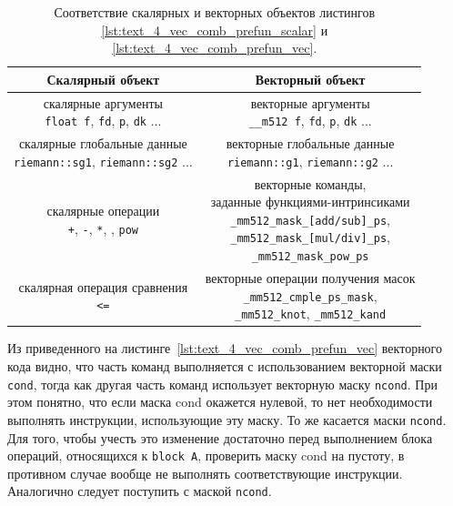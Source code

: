\begin{table}
\centering
\singlespacing
{}\caption{Соответствие скалярных и векторных объектов листингов \ref{lst:text_4_vec_comb_prefun_scalar} и \ref{lst:text_4_vec_comb_prefun_vec}.}
\bigskip
\label{tbl:text_4_vec_comb_prefun_obj}
\begin{tabular}{ | c | c | }
  \hline
  Скалярный объект & Векторный объект \\ \hline\hline
  \makecell{скалярные аргументы \\ \texttt{float f}, \texttt{fd}, \texttt{p}, \texttt{dk} ...} & \makecell{векторные аргументы \\ \texttt{\_\_m512 f}, \texttt{fd}, \texttt{p}, \texttt{dk} ...} \\ \hline
  \makecell{скалярные глобальные данные \\ \texttt{riemann::sg1}, \texttt{riemann::sg2} ...} & \makecell{векторные глобальные данные \\ \texttt{riemann::g1}, \texttt{riemann::g2} ...} \\ \hline
  \makecell{скалярные операции \\ \texttt{+}, \texttt{-}, \texttt{*}, \texttt{\/}, \texttt{pow}} & \makecell{векторные команды, \\ заданные функциями-интринсиками \\ \texttt{\_mm512\_mask\_[add/sub]\_ps}, \\ \texttt{\_mm512\_mask\_[mul/div]\_ps}, \\ \texttt{\_mm512\_mask\_pow\_ps}} \\ \hline
  \makecell{скалярная операция сравнения \\ \texttt{<=}} & \makecell{векторные операции получения масок \\ \texttt{\_mm512\_cmple\_ps\_mask}, \\ \texttt{\_mm512\_knot}, \texttt{\_mm512\_kand}} \\ \hline
\end{tabular}
\end{table}

Из приведенного на листинге~\ref{lst:text_4_vec_comb_prefun_vec} векторного кода видно, что часть команд выполняется с использованием векторной маски \texttt{cond}, тогда как другая часть команд использует векторную маску \texttt{ncond}.
При этом понятно, что если маска cond окажется нулевой, то нет необходимости выполнять инструкции, использующие эту маску.
То же касается маски \texttt{ncond}.
Для того, чтобы учесть это изменение достаточно перед выполнением блока операций, относящихся к \texttt{block A}, проверить маску cond на пустоту, в противном случае вообще не выполнять соответствующие инструкции.
Аналогично следует поступить с маской \texttt{ncond}. 

